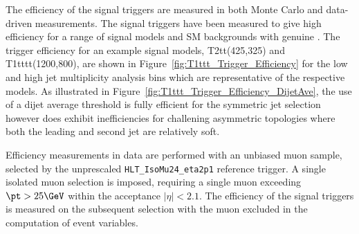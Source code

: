 The efficiency of the signal triggers are measured in both Monte Carlo and data-driven measurements.
The signal triggers have been measured to give high efficiency for a range of signal models and SM 
backgrounds with genuine \met. The trigger efficiency for an example signal models, T2tt(425,325) and T1tttt(1200,800), 
are shown in Figure~\ref{fig:T1ttt_Trigger_Efficiency} for the low and high jet multiplicity analysis bins which are 
representative of the respective models. As illustrated in Figure~\ref{fig:T1ttt_Trigger_Efficiency_DijetAve}, the use of a dijet 
average threshold is fully efficient for the symmetric jet selection however does exhibit inefficiencies for challening asymmetric 
topologies where both the leading and second jet are relatively soft.




Efficiency measurements in data are performed with an unbiased muon sample, selected by the unprescaled \verb!HLT_IsoMu24_eta2p1! 
reference trigger. A single isolated muon selection is imposed, requiring a single muon exceeding $\pt > 25 \GeV$ 
within the acceptance $|\eta| < 2.1$. The efficiency of the signal triggers is measured on the subsequent selection 
with the muon excluded in the computation of event variables.



